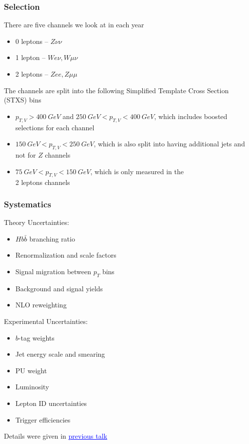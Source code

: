 \documentclass{beamer}
\newcommand{\link}[2]{\href{#2}{\textcolor{blue}{\underline{#1}}}}
\begin{document}
\begin{frame}
  \frametitle{Selection}

  There are five channels we look at in each year
  \begin{itemize}
  \item 0 leptons -- $Z\nu\nu$
  \item 1 lepton -- $We\nu, W\mu\nu$
  \item 2 leptons -- $Zee, Z\mu\mu$
  \end{itemize}
  The channels are split into the following Simplified Template Cross Section (STXS) bins
  \begin{itemize}
  \item $p_{T,V} > \SI{400}{GeV}$ and $\SI{250}{GeV} < p_{T,V} < \SI{400}{GeV}$,
    which includes boosted selections for each channel
  \item $\SI{150}{GeV} < p_{T,V} < \SI{250}{GeV}$,
    which is also split into having additional jets and not for $Z$ channels
  \item $\SI{75}{GeV} < p_{T,V} < \SI{150}{GeV}$,
    which is only measured in the \\ 2 leptons channels
  \end{itemize}

\end{frame}

\begin{frame}
  \frametitle{Systematics}

  Theory Uncertainties:
  \begin{itemize}
  \item $Hb\bar{b}$ branching ratio
  \item Renormalization and scale factors
  \item Signal migration between $p_T$ bins
  \item Background and signal yields
  \item NLO reweighting
  \end{itemize}

  Experimental Uncertainties:
  \begin{itemize}
  \item $b$-tag weights
  \item Jet energy scale and smearing
  \item PU weight
  \item Luminosity
  \item Lepton ID uncertainties
  \item Trigger efficiencies
  \end{itemize}

  Details were given in \link{previous talk}{https://indico.cern.ch/event/961164/#6-vhbb-hig-20-001-status}

\end{frame}
\end{document}
